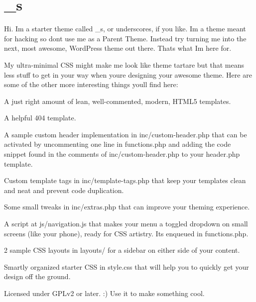 

\section*{\+\_\+s }

Hi. I\textquotesingle{}m a starter theme called {\ttfamily \+\_\+s}, or {\ttfamily underscores}, if you like. I\textquotesingle{}m a theme meant for hacking so don\textquotesingle{}t use me as a Parent Theme. Instead try turning me into the next, most awesome, Word\+Press theme out there. That\textquotesingle{}s what I\textquotesingle{}m here for.

My ultra-\/minimal C\+S\+S might make me look like theme tartare but that means less stuff to get in your way when you\textquotesingle{}re designing your awesome theme. Here are some of the other more interesting things you\textquotesingle{}ll find here\+:


\begin{DoxyItemize}
\item A just right amount of lean, well-\/commented, modern, H\+T\+M\+L5 templates.
\item A helpful 404 template.
\item A sample custom header implementation in {\ttfamily inc/custom-\/header.\+php} that can be activated by uncommenting one line in {\ttfamily functions.\+php} and adding the code snippet found in the comments of {\ttfamily inc/custom-\/header.\+php} to your {\ttfamily header.\+php} template.
\item Custom template tags in {\ttfamily inc/template-\/tags.\+php} that keep your templates clean and neat and prevent code duplication.
\item Some small tweaks in {\ttfamily inc/extras.\+php} that can improve your theming experience.
\item A script at {\ttfamily js/navigation.\+js} that makes your menu a toggled dropdown on small screens (like your phone), ready for C\+S\+S artistry. It\textquotesingle{}s enqueued in {\ttfamily functions.\+php}.
\item 2 sample C\+S\+S layouts in {\ttfamily layouts/} for a sidebar on either side of your content.
\item Smartly organized starter C\+S\+S in {\ttfamily style.\+css} that will help you to quickly get your design off the ground.
\item Licensed under G\+P\+Lv2 or later. \+:) Use it to make something cool.
\end{DoxyItemize}

